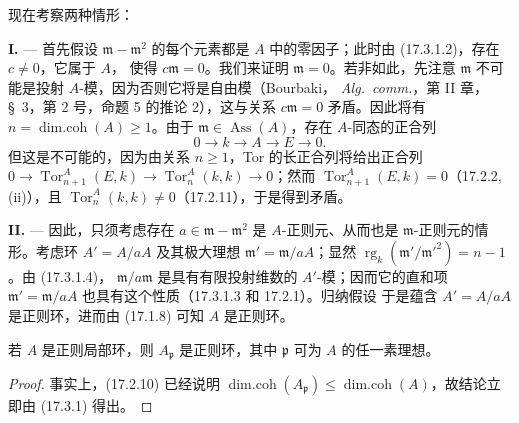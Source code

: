 现在考察两种情形：

\medskip\noindent\textbf{I.} --- 首先假设 $\mathfrak{m}-\mathfrak{m}^2$
的每个元素都是 $A$ 中的零因子；此时由 (17.3.1.2)，存在 $c\neq0$，它属于 $A$，
使得 $c\mathfrak{m}=0$。我们来证明 $\mathfrak{m}=0$。若非如此，先注意
$\mathfrak{m}$ 不可能是投射 $A$-模，因为否则它将是自由模（Bourbaki，
\emph{Alg.~comm.}，第 II 章，\S~3，第 2 号，命题 5 的推论 2），这与关系
$c\mathfrak{m}=0$ 矛盾。因此将有
$n=\operatorname{dim.coh}(A)\geq1$。由于
$\mathfrak{m}\in\operatorname{Ass}(A)$，存在 $A$-同态的正合列
\[
  0\longrightarrow k\longrightarrow A\longrightarrow E\longrightarrow0.
\]
但这是不可能的，因为由关系 $n\geq1$，Tor 的长正合列将给出正合列
$0\longrightarrow\operatorname{Tor}^A_{n+1}(E,k)\longrightarrow
\operatorname{Tor}^A_n(k,k)\longrightarrow0$；然而
$\operatorname{Tor}^A_{n+1}(E,k)=0$（17.2.2, (ii)），且
$\operatorname{Tor}^A_n(k,k)\neq0$（17.2.11），于是得到矛盾。

\medskip\noindent\textbf{II.} --- 因此，只须考虑存在
$a\in\mathfrak{m}-\mathfrak{m}^2$ 是 $A$-正则元、从而也是
$\mathfrak{m}$-正则元的情形。考虑环 $A'=A/aA$ 及其极大理想
$\mathfrak{m}'=\mathfrak{m}/aA$；显然
$\operatorname{rg}_k(\mathfrak{m}'/\mathfrak{m}'^2)=n-1$。由 (17.3.1.4)，
$\mathfrak{m}/a\mathfrak{m}$ 是具有有限投射维数的 $A'$-模；因而它的直和项
$\mathfrak{m}'=\mathfrak{m}/aA$ 也具有这个性质（17.3.1.3 和 17.2.1）。归纳假设
于是蕴含 $A'=A/aA$ 是正则环，进而由 (17.1.8) 可知 $A$ 是正则环。

\begin{corollary}[17.3.2]
\label{0.17.3.2-fr}
若 $A$ 是正则局部环，则 $A_{\mathfrak{p}}$ 是正则环，其中
$\mathfrak{p}$ 可为 $A$ 的任一素理想。
\end{corollary}

\begin{proof}
事实上，(17.2.10) 已经说明
$\operatorname{dim.coh}(A_{\mathfrak{p}})\leq
\operatorname{dim.coh}(A)$，故结论立即由 (17.3.1) 得出。
\end{proof}

